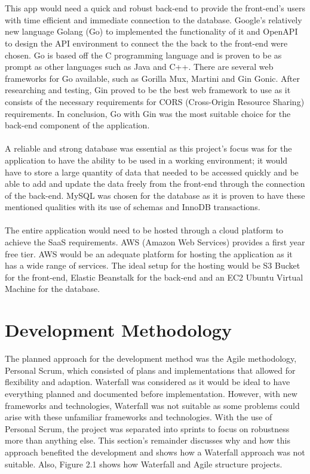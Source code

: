 \\\\ This app would need a quick and robust back-end to provide the front-end's users with time efficient and immediate connection to the database. Google's relatively new language Golang (Go) to implemented the functionality of it and OpenAPI to design the API environment to connect the the back to the front-end were chosen. Go is based off the C programming language and is proven to be as prompt as other languages such as Java and C++. There are several web frameworks for Go available, such as Gorilla Mux, Martini and Gin Gonic. After researching and testing, Gin proved to be the best web framework to use as it consists of the necessary requirements for CORS (Cross-Origin Resource Sharing) requirements. In conclusion, Go with Gin was the most suitable choice for the back-end component of the application.
\\\\ A reliable and strong database was essential as this project's focus was for the application to have the ability to be used in a working environment; it would have to store a large quantity of data that needed to be accessed quickly and be able to add and update the data freely from the front-end through the connection of the back-end. MySQL was chosen for the database as it is proven to have these mentioned qualities with its use of schemas and InnoDB transactions. 
\\\\ The entire application would need to be hosted through a cloud platform to achieve the SaaS requirements. AWS (Amazon Web Services) provides a first year free tier. AWS would be an adequate platform for hosting the application as it has a wide range of services. The ideal setup for the hosting would be S3 Bucket for the front-end, Elastic Beanstalk for the back-end and an EC2 Ubuntu Virtual Machine for the database.

\section{Development Methodology}
The planned approach for the development method was the Agile methodology, Personal Scrum, which consisted of plans and implementations that allowed for flexibility and adaption. Waterfall was considered as it would be ideal to have everything planned and documented before implementation. However, with new frameworks and technologies, Waterfall was not suitable as some problems could arise with these unfamiliar frameworks and technologies. With the use of Personal Scrum, the project was separated into sprints to focus on robustness more than anything else. This section's remainder discusses why and how this approach benefited the development and shows how a Waterfall approach was not suitable. Also, Figure 2.1 shows how Waterfall and Agile structure projects.


